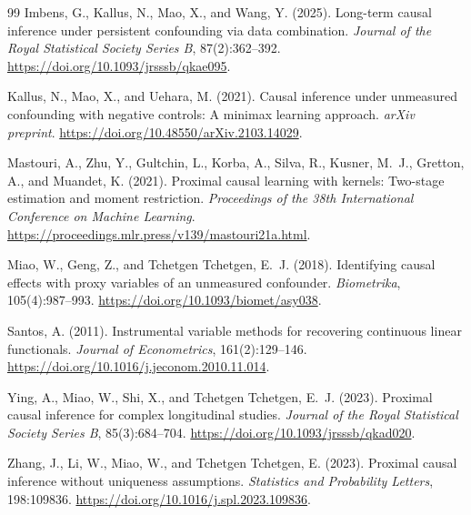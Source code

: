 \documentclass[11pt]{article}
\theoremstyle{definition}
\theoremstyle{plain}
\theoremstyle{remark}
\begin{document}
\begin{thebibliography}{99}
Imbens, G., Kallus, N., Mao, X., and Wang, Y. (2025).
\newblock Long-term causal inference under persistent confounding via data
combination.
\newblock \emph{Journal of the Royal Statistical Society Series B},
87(2):362--392.
\newblock \url{https://doi.org/10.1093/jrsssb/qkae095}.

Kallus, N., Mao, X., and Uehara, M. (2021).
\newblock Causal inference under unmeasured confounding with negative controls:
A minimax learning approach.
\newblock \emph{arXiv preprint}.
\newblock \url{https://doi.org/10.48550/arXiv.2103.14029}.

Mastouri, A., Zhu, Y., Gultchin, L., Korba, A., Silva, R., Kusner, M.~J.,
Gretton, A., and Muandet, K. (2021).
\newblock Proximal causal learning with kernels: Two-stage estimation and
moment restriction.
\newblock \emph{Proceedings of the 38th International Conference on Machine
Learning}.
\newblock \url{https://proceedings.mlr.press/v139/mastouri21a.html}.

Miao, W., Geng, Z., and Tchetgen Tchetgen, E.~J. (2018).
\newblock Identifying causal effects with proxy variables of an unmeasured
confounder.
\newblock \emph{Biometrika}, 105(4):987--993.
\newblock \url{https://doi.org/10.1093/biomet/asy038}.

Santos, A. (2011).
\newblock Instrumental variable methods for recovering continuous linear
functionals.
\newblock \emph{Journal of Econometrics}, 161(2):129--146.
\newblock \url{https://doi.org/10.1016/j.jeconom.2010.11.014}.

Ying, A., Miao, W., Shi, X., and Tchetgen Tchetgen, E.~J. (2023).
\newblock Proximal causal inference for complex longitudinal studies.
\newblock \emph{Journal of the Royal Statistical Society Series B},
85(3):684--704.
\newblock \url{https://doi.org/10.1093/jrsssb/qkad020}.

Zhang, J., Li, W., Miao, W., and Tchetgen Tchetgen, E. (2023).
\newblock Proximal causal inference without uniqueness assumptions.
\newblock \emph{Statistics and Probability Letters}, 198:109836.
\newblock \url{https://doi.org/10.1016/j.spl.2023.109836}.
\end{thebibliography}
\end{document}
